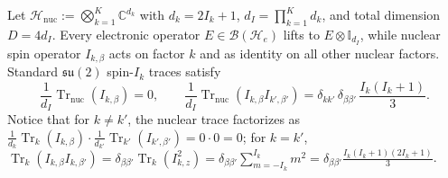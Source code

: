 \documentclass[onecolumn,10pt,notitlepage,amsmath,amssymb,floatfix]{revtex4-2}
\theoremstyle{plain}
\theoremstyle{definition}
\newcommand{\Tr}{\operatorname{Tr}}
\begin{document}
Let $\mathcal{H}_{\mathrm{nuc}} := \bigotimes_{k=1}^K \mathbb{C}^{d_k}$ with $d_k = 2I_k + 1$, $d_I = \prod_{k=1}^K d_k$, and total dimension $D = 4d_I$. Every electronic operator $E \in \mathcal{B}(\mathcal{H}_e)$ lifts to $E \otimes \mathbb{I}_{d_I}$, while nuclear spin operator $I_{k,\beta}$ acts on factor $k$ and as identity on all other nuclear factors. Standard $\mathfrak{su}(2)$ spin-$I_k$ traces satisfy
\begin{equation}
\label{eq:S1_nuc_trace}
\frac{1}{d_I}\Tr_{\mathrm{nuc}}(I_{k,\beta}) = 0, \qquad
\frac{1}{d_I}\Tr_{\mathrm{nuc}}(I_{k,\beta} I_{k',\beta'}) = \delta_{kk'}\,\delta_{\beta\beta'}\,\frac{I_k(I_k+1)}{3}.
\end{equation}
Notice that for $k \neq k'$, the nuclear trace factorizes as $\frac{1}{d_k}\Tr_k(I_{k,\beta}) \cdot \frac{1}{d_{k'}}\Tr_{k'}(I_{k',\beta'}) = 0 \cdot 0 = 0$; for $k = k'$, $\Tr_k(I_{k,\beta} I_{k,\beta'}) = \delta_{\beta\beta'}\Tr_k(I_{k,z}^2) = \delta_{\beta\beta'}\sum_{m=-I_k}^{I_k} m^2 = \delta_{\beta\beta'}\frac{I_k(I_k+1)(2I_k+1)}{3}$.
\end{document}
